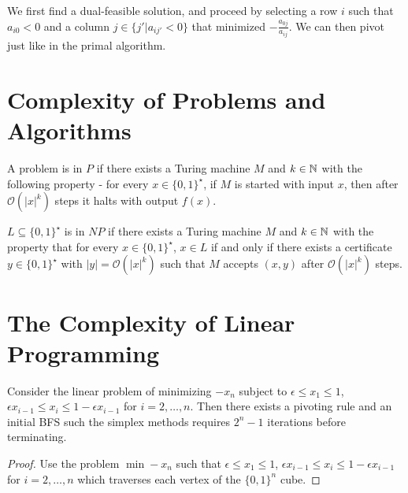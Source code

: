 \begin{defn}
  \label{sec:advanc-simpl-proc-2}
  We first find a dual-feasible solution, and proceed by selecting a
  row $i$ such that $a_{i0} < 0$ and a column $j \in \{ j' | a_{ij'} <
0 \} $ that minimized $-\frac{a_{0j}}{a_{ij}}$.  We can then pivot
just like in the primal algorithm.
\end{defn}


\section{Complexity of Problems and Algorithms}
\label{sec:compl-probl-algor}

\begin{defn}
  \label{sec:compl-probl-algor-1}
  A problem is in $P$ if there exists a Turing machine $M$ and $k \in
  \mathbb{N}$ with the following property - for every $x \in \{ 0, 1
  \}^{\star}$, if $M$ is started with input $x$, then after
  $\mathcal{O}(|x|^{k})$ steps it halts with output $f(x)$.

  $L \subseteq \{ 0, 1 \}^{\star} $ is in $NP$ if there exists a
  Turing machine $M$ and $k \in \mathbb{N}$ with the property that for every
  $x \in \{ 0, 1 \}^{\star} $, $x \in L$ if and only if there exists a
  certificate $y \in \{ 0, 1 \}^{\star} $ with $|y| =
  \mathcal{O}(|x|^{k})$ such that $M$ accepts $(x, y)$ after
  $\mathcal{O}(|x|^{k})$ steps.
\end{defn}

\section{The Complexity of Linear Programming}
\label{sec:compl-line-progr}

\begin{thm}
  \label{sec:compl-line-progr-1}
  Consider the linear problem of minimizing $-x_{n}$ subject to
  $\epsilon \leq x_{1} \leq 1$, $\epsilon x_{i-1} \leq x_{i} \leq 1 -
  \epsilon x_{i-1}$ for $i = 2, \dots, n$. Then there exists a
  pivoting rule and an initial BFS such the simplex methods requires
  $2^{n} - 1$ iterations before terminating.
\end{thm}

\begin{proof}
  Use the problem $\min -x_{n}$ such that $\epsilon \leq x_{1} \leq 1$,
  $\epsilon x_{i-1} \leq x_{i} \leq 1 - \epsilon x_{i-1}$ for $i = 2,
  \dots, n$ which traverses each vertex of the $\{ 0, 1 \}^{n}$ cube.
\end{proof}

